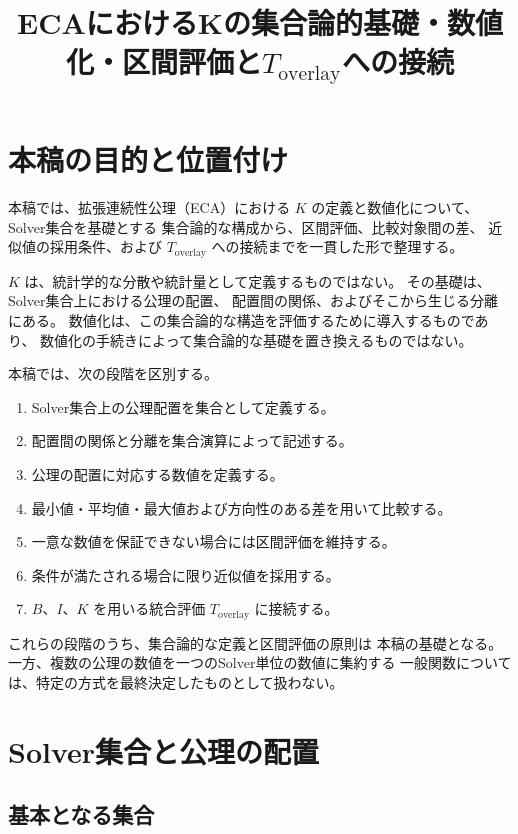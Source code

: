 \documentclass[a4paper,12pt]{article}
\title{ECAにおけるKの集合論的基礎・数値化・区間評価と$T_{\mathrm{overlay}}$への接続}
\author{}
\date{}
\begin{document}
\maketitle

\section{本稿の目的と位置付け}

本稿では、拡張連続性公理（ECA）における
$K$ の定義と数値化について、Solver集合を基礎とする
集合論的な構成から、区間評価、比較対象間の差、
近似値の採用条件、および
$T_{\mathrm{overlay}}$ への接続までを一貫した形で整理する。

$K$ は、統計学的な分散や統計量として定義するものではない。
その基礎は、Solver集合上における公理の配置、
配置間の関係、およびそこから生じる分離にある。
数値化は、この集合論的な構造を評価するために導入するものであり、
数値化の手続きによって集合論的な基礎を置き換えるものではない。

本稿では、次の段階を区別する。

\begin{enumerate}[label=(\arabic*)]
    \item Solver集合上の公理配置を集合として定義する。
    \item 配置間の関係と分離を集合演算によって記述する。
    \item 公理の配置に対応する数値を定義する。
    \item 最小値・平均値・最大値および方向性のある差を用いて比較する。
    \item 一意な数値を保証できない場合には区間評価を維持する。
    \item 条件が満たされる場合に限り近似値を採用する。
    \item $B$、$I$、$K$ を用いる統合評価
    $T_{\mathrm{overlay}}$ に接続する。
\end{enumerate}

これらの段階のうち、集合論的な定義と区間評価の原則は
本稿の基礎となる。
一方、複数の公理の数値を一つのSolver単位の数値に集約する
一般関数については、特定の方式を最終決定したものとして扱わない。

\section{Solver集合と公理の配置}

\subsection{基本となる集合}
\end{document}
